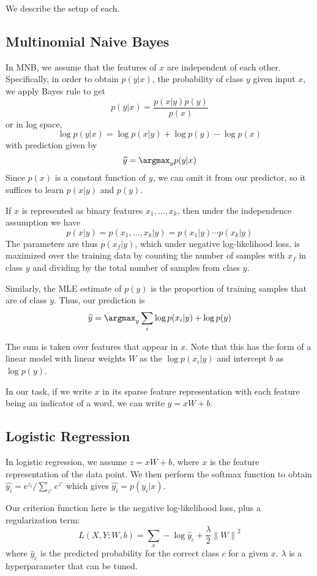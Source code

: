 \documentclass[11pt]{article}
\begin{document}
We describe the setup of each.

\subsection{Multinomial Naive Bayes}

In MNB, we assume that the features of $x$ are independent of each other. Specifically, in order to obtain $p(y | x)$, the probability of class $y$ given input $x$, we apply Bayes rule to get
$$p(y | x) = \frac{p(x | y)p(y)}{p(x)}$$
or in log space,
$$\log p(y | x) = \log p(x | y) + \log p(y) - \log p(x)$$
with prediction given by
$$\widehat{y} = \argmax_y p(y|x)$$
Since $p(x)$ is a constant function of $y$, we can omit it from our predictor, so it suffices to learn $p(x | y)$ and $p(y)$.

If $x$ is represented as binary features $x_1, \ldots, x_k$, then under the independence assumption we have
$$p(x | y) = p(x_1, \ldots, x_k | y) = p(x_1 | y) \cdots p(x_k | y)$$
The parameters are thus $p(x_f | y)$, which under negative log-likelihood loss, is maximized over the training data by counting the number of samples with $x_f$ in class $y$ and dividing by the total number of samples from class $y$.

Similarly, the MLE estimate of $p(y)$ is the proportion of training samples that are of class $y$. Thus, our prediction is
$$\widehat{y} = \argmax_y \sum_i \log p(x_i | y) + \log p(y)$$

The sum is taken over features that appear in $x$. Note that this has the form of a linear model with linear weights $W$ as the $\log p(x_i | y)$ and intercept $b$ as $\log p(y)$.

In our task, if we write $x$ in its sparse feature representation with each feature being an indicator of a word, we can write $\widehat{y} = xW + b$.

\subsection{Logistic Regression}

In logistic regression, we assume $z = xW + b$, where $x$ is the feature representation of the data point. We then perform the softmax function to obtain $\widehat{y_i} = e^{z_i} / \sum_{z'} e^{z'}$ which gives $\widehat{y_i} = p(y_i | x)$.

Our criterion function here is the negative log-likelihood loss, plus a regularization term:
$$L(X, Y; W, b) = \sum_x -\log \widehat{y}_c + \frac{\lambda}{2} {\lVert W \rVert}^2$$
where $\widehat{y}_c$ is the predicted probability for the correct class $c$ for a given $x$. $\lambda$ is a hyperparameter that can be tuned.
\end{document}

